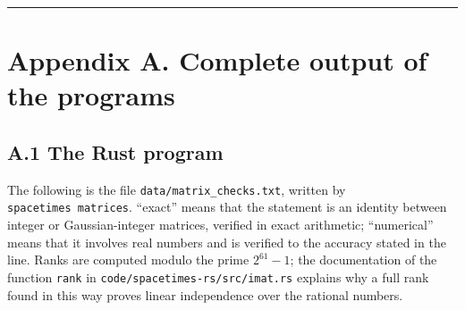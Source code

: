 \documentclass[
  10pt,
]{article}
\begin{document}
\begin{center}\rule{0.5\linewidth}{0.5pt}\end{center}

\hypertarget{appendix-a.-complete-output-of-the-programs}{%
\section{Appendix A. Complete output of the
programs}\label{appendix-a.-complete-output-of-the-programs}}

\hypertarget{a.1-the-rust-program}{%
\subsection{A.1 The Rust program}\label{a.1-the-rust-program}}

The following is the file \texttt{data/matrix\_checks.txt}, written by
\texttt{spacetimes\ matrices}. ``exact'' means that the statement is an
identity between integer or Gaussian-integer matrices, verified in exact
arithmetic; ``numerical'' means that it involves real numbers and is
verified to the accuracy stated in the line. Ranks are computed modulo
the prime \(2^{61}-1\); the documentation of the function \texttt{rank}
in \texttt{code/spacetimes-rs/src/imat.rs} explains why a full rank
found in this way proves linear independence over the rational numbers.
\end{document}
